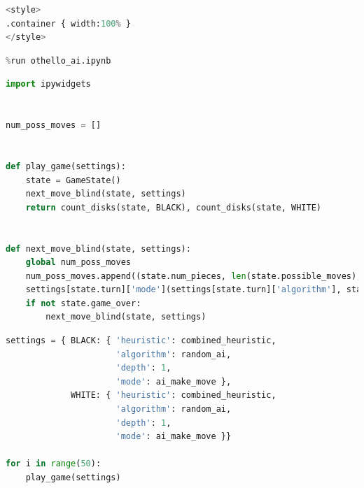 \begin{lstlisting}[language=Python]
%%HTML
<style>
.container { width:100% }
</style>
\end{lstlisting}

\begin{lstlisting}[language=Python]
%run othello_game.ipynb
%run othello_ai.ipynb
\end{lstlisting}

\begin{lstlisting}[language=Python]
import ipywidgets


num_poss_moves = []


def play_game(settings):
    state = GameState()
    next_move_blind(state, settings)
    return count_disks(state, BLACK), count_disks(state, WHITE)


def next_move_blind(state, settings):
    global num_poss_moves
    num_poss_moves.append((state.num_pieces, len(state.possible_moves), len(get_possible_moves(state, -state.turn))))
    settings[state.turn]['mode'](settings[state.turn]['algorithm'], state, settings[state.turn]['depth'], settings[state.turn]['heuristic'])
    if not state.game_over:
        next_move_blind(state, settings)
\end{lstlisting}

\begin{lstlisting}[language=Python]
settings = { BLACK: { 'heuristic': combined_heuristic,
                      'algorithm': random_ai,
                      'depth': 1,
                      'mode': ai_make_move },
             WHITE: { 'heuristic': combined_heuristic,
                      'algorithm': random_ai,
                      'depth': 1,
                      'mode': ai_make_move }}

for i in range(50):
    play_game(settings)
\end{lstlisting}

